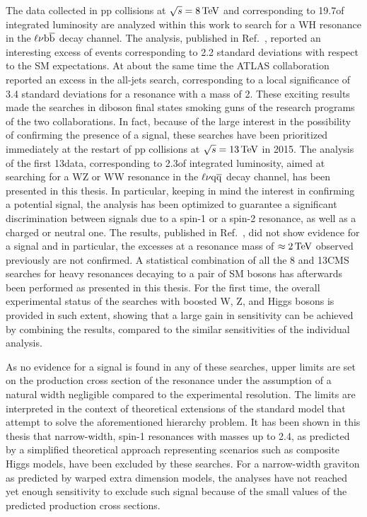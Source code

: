 The data collected in pp collisions at $\sqrt{s} = 8\,\text{Te\hspace{-.08em}V}$ and corresponding to 19.7\fbinv of integrated luminosity are analyzed within this work to search for a WH resonance in the $\ell\nu{\mathrm{b}\overline{\mathrm{b}}}$ decay channel. The analysis, published in Ref.~\cite{Khachatryan:2016yji}, reported an interesting excess of events corresponding to 2.2 standard deviations with respect to the SM expectations. At about the same time the ATLAS collaboration reported an excess in the all-jets search, corresponding to a local significance of 3.4 standard deviations for a resonance with a mass of 2\TeV. These exciting results made the searches in diboson final states smoking guns of the research programs of the two collaborations. In fact, because of the large interest in the possibility of confirming the presence of a signal, these searches have been prioritized immediately at the restart of pp collisions at $\sqrt{s} = 13\,\text{Te\hspace{-.08em}V}$ in 2015. The analysis of the first 13\TeV data, corresponding to 2.3\fbinv of integrated luminosity, aimed at searching for a WZ or WW resonance in the $\ell\nu\mathrm{q}\overline{\mathrm{q}}$ decay channel, has been presented in this thesis. In particular, keeping in mind the interest in confirming a potential signal, the analysis has been optimized to guarantee a significant discrimination between signals due to a spin-1 or a spin-2 resonance, as well as a charged or neutral one.
The results, published in Ref.~\cite{CMS-PAS-EXO-15-002}, did not show evidence for a signal and in particular, the excesses at a resonance mass of $\approx2\,\text{Te\hspace{-.08em}V}$ observed previously are not confirmed.
A statistical combination of all the 8 and 13\TeV CMS searches for heavy resonances decaying to a pair of SM bosons has afterwards been performed as presented in this thesis.
For the first time, the overall experimental status of the searches with boosted W, Z, and Higgs bosons is provided in such extent, showing that a large gain in sensitivity can be achieved by combining the results, compared to the similar sensitivities of the individual analysis.

As no evidence for a signal is found in any of these searches, upper limits are set on the production cross section of the resonance under the assumption of a natural width negligible compared to the experimental resolution.
The limits are interpreted in the context of theoretical extensions of the standard model that attempt to solve the aforementioned hierarchy problem.
It has been shown in this thesis that narrow-width, spin-1 resonances with masses up to 2.4\TeV, as predicted by a simplified theoretical approach representing scenarios such as composite Higgs models, have been excluded by these searches. For a narrow-width graviton as predicted by warped extra dimension models, the analyses have not reached yet enough sensitivity to exclude such signal because of the small values of the predicted production cross sections.

